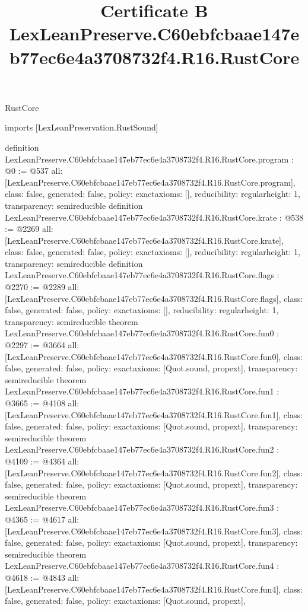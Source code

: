 \begin{lexlean}{RustCore}
\title{Certificate B LexLeanPreserve.C60ebfcbaae147eb77ec6e4a3708732f4.R16.RustCore}
\begin{coremodule}
imports [LexLeanPreservation.RustSound]

definition LexLeanPreserve.C60ebfcbaae147eb77ec6e4a3708732f4.R16.RustCore.program : @0 := @537 {
  all: [LexLeanPreserve.C60ebfcbaae147eb77ec6e4a3708732f4.R16.RustCore.program],
  class: false,
  generated: false,
  policy: exact{axioms: []},
  reducibility: regular{height: 1},
  transparency: semireducible
}
definition LexLeanPreserve.C60ebfcbaae147eb77ec6e4a3708732f4.R16.RustCore.krate : @538 := @2269 {
  all: [LexLeanPreserve.C60ebfcbaae147eb77ec6e4a3708732f4.R16.RustCore.krate],
  class: false,
  generated: false,
  policy: exact{axioms: []},
  reducibility: regular{height: 1},
  transparency: semireducible
}
definition LexLeanPreserve.C60ebfcbaae147eb77ec6e4a3708732f4.R16.RustCore.flags : @2270 := @2289 {
  all: [LexLeanPreserve.C60ebfcbaae147eb77ec6e4a3708732f4.R16.RustCore.flags],
  class: false,
  generated: false,
  policy: exact{axioms: []},
  reducibility: regular{height: 1},
  transparency: semireducible
}
theorem LexLeanPreserve.C60ebfcbaae147eb77ec6e4a3708732f4.R16.RustCore.fun0 : @2297 := @3664 {
  all: [LexLeanPreserve.C60ebfcbaae147eb77ec6e4a3708732f4.R16.RustCore.fun0],
  class: false,
  generated: false,
  policy: exact{axioms: [Quot.sound, propext]},
  transparency: semireducible
}
theorem LexLeanPreserve.C60ebfcbaae147eb77ec6e4a3708732f4.R16.RustCore.fun1 : @3665 := @4108 {
  all: [LexLeanPreserve.C60ebfcbaae147eb77ec6e4a3708732f4.R16.RustCore.fun1],
  class: false,
  generated: false,
  policy: exact{axioms: [Quot.sound, propext]},
  transparency: semireducible
}
theorem LexLeanPreserve.C60ebfcbaae147eb77ec6e4a3708732f4.R16.RustCore.fun2 : @4109 := @4364 {
  all: [LexLeanPreserve.C60ebfcbaae147eb77ec6e4a3708732f4.R16.RustCore.fun2],
  class: false,
  generated: false,
  policy: exact{axioms: [Quot.sound, propext]},
  transparency: semireducible
}
theorem LexLeanPreserve.C60ebfcbaae147eb77ec6e4a3708732f4.R16.RustCore.fun3 : @4365 := @4617 {
  all: [LexLeanPreserve.C60ebfcbaae147eb77ec6e4a3708732f4.R16.RustCore.fun3],
  class: false,
  generated: false,
  policy: exact{axioms: [Quot.sound, propext]},
  transparency: semireducible
}
theorem LexLeanPreserve.C60ebfcbaae147eb77ec6e4a3708732f4.R16.RustCore.fun4 : @4618 := @4843 {
  all: [LexLeanPreserve.C60ebfcbaae147eb77ec6e4a3708732f4.R16.RustCore.fun4],
  class: false,
  generated: false,
  policy: exact{axioms: [Quot.sound, propext]},
}
\end{coremodule}
\end{lexlean}
